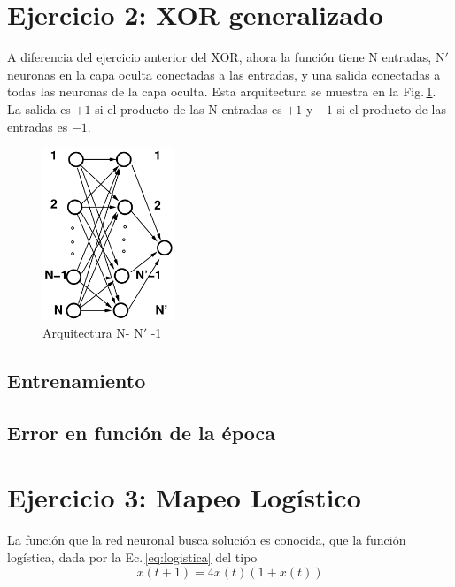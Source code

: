\section*{Ejercicio 2: XOR generalizado}

A diferencia del ejercicio anterior del XOR, ahora la función tiene N entradas, N$'$ neuronas en la capa oculta conectadas a las entradas, y una salida conectadas a todas las neuronas de la capa oculta. Esta arquitectura se muestra en la Fig.\,\ref{fig:arq-NN1}. La salida es $+1$ si el producto de las N entradas es $+1$ y $-1$ si el producto de las entradas es $-1.$

\begin{figure}[H]
	\centering
	\includegraphics[width=0.35\textwidth]{ejer_2_NN1.png}
	\caption{Arquitectura N- N$'$ -1}
	\label{fig:arq-NN1}
\end{figure}

\subsection*{Entrenamiento}

\subsection*{Error en función de la época}

\section*{Ejercicio 3: Mapeo Logístico }

La función que la red neuronal busca solución es conocida, que la función logística, dada por la Ec.\,\ref{eq:logistica} del tipo 
\begin{equation}
	x(t+1) = 4x(t)(1+x(t))
	\label{eq:logistica}
\end{equation}

